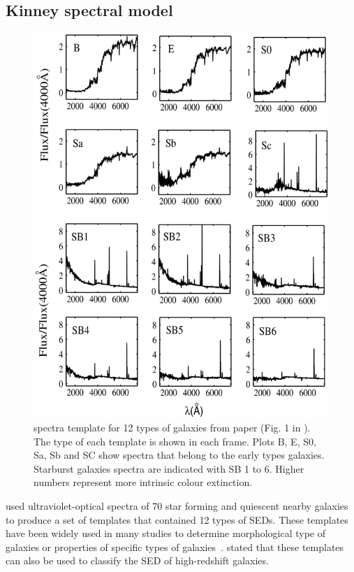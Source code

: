  \subsection{Kinney spectral model}
     \begin{figure}
        \centering
        \includegraphics[width=\textwidth]{../image_paper2/k96.jpg}
        \caption{ spectra template for 12 types of galaxies from  paper (Fig. 1 in ). The type of each template is shown in each frame. Plots B, E, S0, Sa, Sb and SC show spectra that belong to the early types galaxies. Starburst galaxies spectra are indicated with SB 1 to 6. Higher numbers represent more intrinsic colour extinction.}
        \label{fig: k96}
    \end{figure}
      
     used ultraviolet-optical spectra of 70 star forming and quiescent nearby galaxies to produce a set of templates that contained 12 types of SEDs.
    These templates have been widely used in many studies to determine morphological type of galaxies or properties of specific types of galaxies~\citep[e.g.][]{Shakouri16, Paiano16, Laporte16, Holden16}.
     stated that these templates can also be used to classify the SED of high-redshift galaxies. 
    
